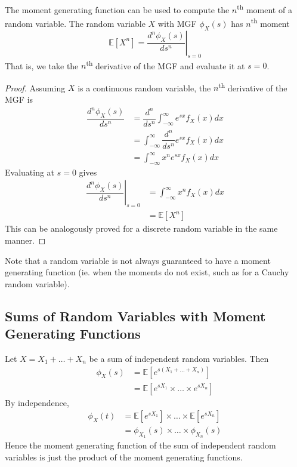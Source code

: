 \documentclass[11pt]{report} %
\begin{document}
The moment generating function can be used to compute the $n$\textsuperscript{th} moment of a random variable. The random variable $X$ with  MGF $\phi_{X}\left(s\right)$ has $n$\textsuperscript{th} moment
\begin{equation}
\mathbb{E}\left[X^{n}\right] = \left.\dfrac{d^{n}\phi_{X}\left(s\right)}{ds^{n}}\right|_{s = 0}
\end{equation}
That is, we take the $n$\textsuperscript{th} derivative of the MGF and evaluate it at $s = 0$.
\begin{proof}
Assuming $X$ is a continuous random variable, the $n$\textsuperscript{th} derivative of the MGF is
\begin{align}
\dfrac{d^{n}\phi_{X}\left(s\right)}{ds^{n}} &= \dfrac{d^{n}}{ds^{n}}\int_{-\infty}^{\infty}e^{sx}f_{X}\left(x\right)dx \\
&= \int_{-\infty}^{\infty}\dfrac{d^{n}}{ds^{n}}e^{sx}f_{X}\left(x\right)dx \\
&= \int_{-\infty}^{\infty}x^{n}e^{sx}f_{X}\left(x\right)dx
\end{align}
Evaluating at $s = 0$ gives
\begin{align}
\left.\dfrac{d^{n}\phi_{X}\left(s\right)}{ds^{n}}\right|_{s = 0} &= \int_{-\infty}^{\infty}x^{n}f_{X}\left(x\right)dx \\
&= \mathbb{E}\left[X^{n}\right]
\end{align}
This can be analogously proved for a discrete random variable in the same manner.
\end{proof}
Note that a random variable is not always guaranteed to have a moment generating function (ie. when the moments do not exist, such as for a Cauchy random variable).

\subsection{Sums of Random Variables with Moment Generating Functions}

Let $X = X_{1} + \dots  + X_{n}$ be a sum of independent random variables. Then
\begin{align}
\phi_{X}\left(s\right) &= \mathbb{E}\left[e^{s\left(X_{1} + \dots + X_{n}\right)}\right] \\
&= \mathbb{E}\left[e^{sX_{1}}\times\dots\times e^{sX_{n}}\right]
\end{align}
By independence,
\begin{align}
\phi_{X}\left(t\right) &= \mathbb{E}\left[e^{sX_{1}}\right]\times\dots\times\mathbb{E}\left[e^{sX_{n}}\right] \\
&= \phi_{X_{1}}\left(s\right)\times\dots\times\phi_{X_{n}}\left(s\right)
\end{align}
Hence the moment generating function of the sum of independent random variables is just the product of the moment generating functions.
\end{document}
